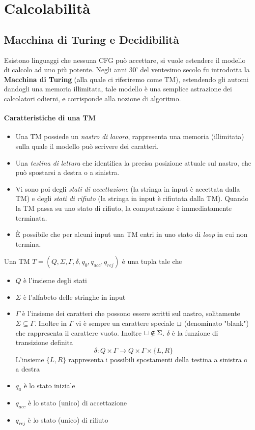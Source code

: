 \documentclass[10pt, letterpaper]{report}
\begin{document}
\chapter{Calcolabilità}
\section{Macchina di Turing e Decidibilità}
Esistono linguaggi che nessuna CFG può accettare, si vuole estendere il modello di calcolo ad uno più 
potente. Negli anni 30' del ventesimo secolo fu introdotta la \textbf{Macchina di Turing} (alla quale ci 
riferiremo come TM), estendendo gli automi dandogli una memoria illimitata, tale modello è una semplice 
astrazione dei calcolatori odierni, e corrisponde alla nozione di algoritmo.\subsubsection{Caratteristiche di una TM}\begin{itemize}
    \item Una TM possiede un \textit{nastro di lavoro}, rappresenta una memoria (illimitata) sulla quale il modello 
    può scrivere dei caratteri. 
    \item Una \textit{testina di lettura} che identifica la precisa posizione attuale sul nastro, che può spostarsi 
    a destra o a sinistra. 
    \item Vi sono poi degli \textit{stati di accettazione} (la stringa in input è accettata dalla TM) e degli 
    \textit{stati di rifiuto} (la stringa in input è rifiutata dalla TM). Quando la TM passa su uno stato di rifiuto, 
    la computazione è immediatamente terminata. 
    \item È possibile che per alcuni input una TM entri in uno stato di \textit{loop} in cui non termina.
\end{itemize}
 Una TM $T=(Q,\Sigma,\Gamma,\delta,q_0,q_{acc},q_{rej})$ è una tupla tale che \begin{itemize}
    \item $Q$ è l'insieme degli stati 
    \item $\Sigma$ è l'alfabeto delle stringhe in input 
    \item $\Gamma$ è l'insieme dei caratteri che possono essere scritti sul nastro, solitamente $\Sigma\subseteq \Gamma$. Inoltre 
    in $\Gamma$ vi è sempre un carattere speciale ${\sqcup}$ (denominato "blank") che rappresenta il carattere vuoto.
    Inoltre ${\sqcup}\notin\Sigma$.
    $\delta$ è la funzione di transizione definita $$ \delta : Q\times \Gamma \rightarrow Q\times \Gamma \times \{L,R\}$$
    L'insieme $\{L,R\}$ rappresenta i possibili spostamenti della testina a sinistra o a destra
    \item $q_0$ è lo stato iniziale 
    \item  $q_{acc}$ è lo stato (unico) di accettazione 
    \item $q_{rej}$ è lo stato (unico) di rifiuto 
\end{itemize}
\end{document}
